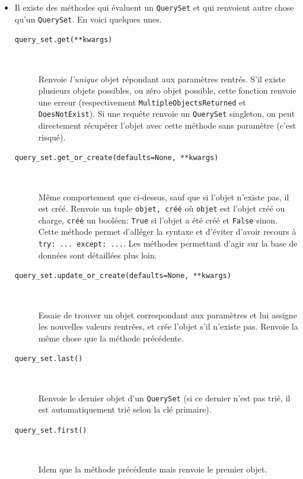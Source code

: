 \documentclass[a4paper, 10pt]{article}
\begin{document}
{\begin{itemize}
    \item Il existe des méthodes qui évaluent un \texttt{QuerySet} et qui renvoient autre chose qu'un \texttt{QuerySet}. En voici quelques unes.

    \begin{description}
        \item[\texttt{query_set.get(**kwargs)}]~

        Renvoie \emph{l'unique} objet répondant aux paramètres rentrés. S'il existe plusieurs objets possibles, ou zéro objet possible, cette fonction renvoie une erreur (respectivement \texttt{MultipleObjectsReturned} et \texttt{DoesNotExist}). Si une requête renvoie un \texttt{QuerySet} singleton, on peut directement récupérer l'objet avec cette méthode sans paramètre (c'est risqué).

        \item[\texttt{query_set.get_or_create(defaults=None, **kwargs)}]~

        Même comportement que ci-dessus, sauf que si l'objet n'existe pas, il est créé. Renvoie un tuple \texttt{objet, créé} où \texttt{objet} est l'objet créé ou charge, \texttt{créé} un booléen: \texttt{True} si l'objet a été créé et \texttt{False} sinon. Cette méthode permet d'alléger la syntaxe et d'éviter d'avoir recours à \texttt{try: ... except: ...}. Les méthodes permettant d'agir sur la base de données sont détaillées plus loin.

        \item[\texttt{query_set.update_or_create(defaults=None, **kwargs)}]~

        Essaie de trouver un objet correspondant aux paramètres et lui assigne les nouvelles valeurs rentrées, et crée l'objet s'il n'existe pas. Renvoie la même chose que la méthode précédente.

        \item[\texttt{query_set.last()}]~

        Renvoie le dernier objet d'un \texttt{QuerySet} (si ce dernier n'est pas trié, il est automatiquement trié selon la clé primaire).

        \item[\texttt{query_set.first()}]~

        Idem que la méthode précédente mais renvoie le premier objet.


\end{description}
\end{itemize}}
\end{document}
